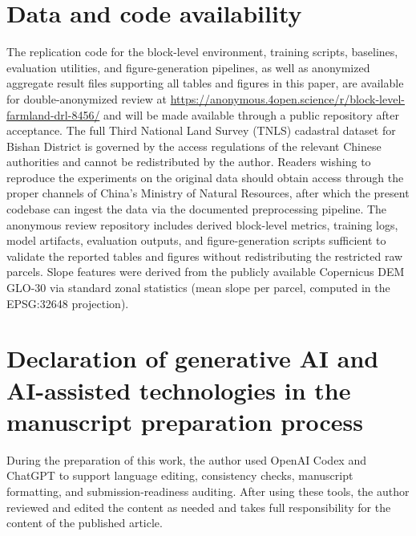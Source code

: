 \documentclass[preprint,12pt]{elsarticle}
\begin{document}
\section*{Data and code availability}
The replication code for the block-level environment, training scripts, baselines, evaluation utilities, and figure-generation pipelines, as well as anonymized aggregate result files supporting all tables and figures in this paper, are available for double-anonymized review at \url{https://anonymous.4open.science/r/block-level-farmland-drl-8456/} and will be made available through a public repository after acceptance. The full Third National Land Survey (TNLS) cadastral dataset for Bishan District is governed by the access regulations of the relevant Chinese authorities and cannot be redistributed by the author. Readers wishing to reproduce the experiments on the original data should obtain access through the proper channels of China's Ministry of Natural Resources, after which the present codebase can ingest the data via the documented preprocessing pipeline. The anonymous review repository includes derived block-level metrics, training logs, model artifacts, evaluation outputs, and figure-generation scripts sufficient to validate the reported tables and figures without redistributing the restricted raw parcels. Slope features were derived from the publicly available Copernicus DEM GLO-30 \citep{copernicus2021dem} via standard zonal statistics (mean slope per parcel, computed in the EPSG:32648 projection).

\section*{Declaration of generative AI and AI-assisted technologies in the manuscript preparation process}
During the preparation of this work, the author used OpenAI Codex and ChatGPT to support language editing, consistency checks, manuscript formatting, and submission-readiness auditing. After using these tools, the author reviewed and edited the content as needed and takes full responsibility for the content of the published article.


\end{document}
